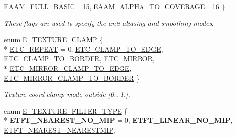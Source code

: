 \begin{DoxyCompactItemize}
\hyperlink{namespaceirr_1_1video_aa8647c2a52bdd3bc15ee773e8f2b149dade3c9a3d46cbedc5304cfa869ab593fd}{E\+A\+A\+M\+\_\+\+F\+U\+L\+L\+\_\+\+B\+A\+S\+IC} =15, 
\hyperlink{namespaceirr_1_1video_aa8647c2a52bdd3bc15ee773e8f2b149dac887edb1977865349bf92db9118f45cd}{E\+A\+A\+M\+\_\+\+A\+L\+P\+H\+A\+\_\+\+T\+O\+\_\+\+C\+O\+V\+E\+R\+A\+GE} =16
 \}\begin{DoxyCompactList}\small\item\em These flags are used to specify the anti-\/aliasing and smoothing modes. \end{DoxyCompactList}
\item 
enum \hyperlink{namespaceirr_1_1video_a5d9933edc5ed7704a7a084f84b39811f}{E\+\_\+\+T\+E\+X\+T\+U\+R\+E\+\_\+\+C\+L\+A\+MP} \{ \\*
\hyperlink{namespaceirr_1_1video_a5d9933edc5ed7704a7a084f84b39811fa2e2a1ec3f8045fd2653c4cd6171ac12b}{E\+T\+C\+\_\+\+R\+E\+P\+E\+AT} = 0, 
\hyperlink{namespaceirr_1_1video_a5d9933edc5ed7704a7a084f84b39811fac35b809116d29a3c77bab79b6a31eda3}{E\+T\+C\+\_\+\+C\+L\+A\+M\+P\+\_\+\+T\+O\+\_\+\+E\+D\+GE}, 
\hyperlink{namespaceirr_1_1video_a5d9933edc5ed7704a7a084f84b39811fa3c8beb993f3bb31a76a3811eb460882a}{E\+T\+C\+\_\+\+C\+L\+A\+M\+P\+\_\+\+T\+O\+\_\+\+B\+O\+R\+D\+ER}, 
\hyperlink{namespaceirr_1_1video_a5d9933edc5ed7704a7a084f84b39811fa6c86659cd8f985e5e7701220660d6d76}{E\+T\+C\+\_\+\+M\+I\+R\+R\+OR}, 
\\*
\hyperlink{namespaceirr_1_1video_a5d9933edc5ed7704a7a084f84b39811faa4629bd5f10231c7e8b765ed6884e7c8}{E\+T\+C\+\_\+\+M\+I\+R\+R\+O\+R\+\_\+\+C\+L\+A\+M\+P\+\_\+\+T\+O\+\_\+\+E\+D\+GE}, 
\hyperlink{namespaceirr_1_1video_a5d9933edc5ed7704a7a084f84b39811fa43169cc95e7157afe93429324a3ba371}{E\+T\+C\+\_\+\+M\+I\+R\+R\+O\+R\+\_\+\+C\+L\+A\+M\+P\+\_\+\+T\+O\+\_\+\+B\+O\+R\+D\+ER}
 \}\begin{DoxyCompactList}\small\item\em Texture coord clamp mode outside \mbox{[}0., 1.\mbox{]}. \end{DoxyCompactList}
\item 
enum \hyperlink{namespaceirr_1_1video_a61340ba1b61c226069fd1cea45c52a24}{E\+\_\+\+T\+E\+X\+T\+U\+R\+E\+\_\+\+F\+I\+L\+T\+E\+R\+\_\+\+T\+Y\+PE} \{ \\*
{\bfseries E\+T\+F\+T\+\_\+\+N\+E\+A\+R\+E\+S\+T\+\_\+\+N\+O\+\_\+\+M\+IP} = 0, 
{\bfseries E\+T\+F\+T\+\_\+\+L\+I\+N\+E\+A\+R\+\_\+\+N\+O\+\_\+\+M\+IP}, 
\hyperlink{namespaceirr_1_1video_a61340ba1b61c226069fd1cea45c52a24ab951d719c7313fc171cd89d083f1b353}{E\+T\+F\+T\+\_\+\+N\+E\+A\+R\+E\+S\+T\+\_\+\+N\+E\+A\+R\+E\+S\+T\+M\+IP}, 

\end{DoxyCompactItemize}
